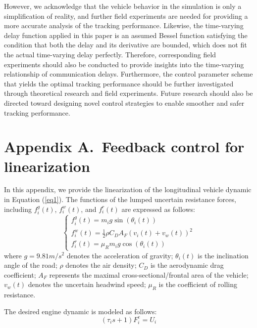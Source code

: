 \documentclass[a4paper]{cas-sc}
\begin{document}
However, we acknowledge that the vehicle behavior in the simulation is only a simplification of reality, and further field experiments are needed for providing a more accurate analysis of the tracking performance. Likewise, the time-varying delay function applied in this paper is an assumed Bessel function satisfying the condition that both the delay and its derivative are bounded, which does not fit the actual time-varying delay perfectly. Therefore, corresponding field experiments should also be conducted to provide insights into the time-varying relationship of communication delays. Furthermore, the control parameter scheme that yields the optimal tracking performance should be further investigated through theoretical research and field experiments. Future research should also be directed toward designing novel control strategies to enable smoother and safer tracking performance.


\appendix


\section*{Appendix A.~Feedback control for linearization}
\label{AppendixA}
In this appendix, we provide the linearization of the longitudinal vehicle dynamic in Equation (\ref{eq1}). The functions of the lumped uncertain resistance forces, including $f_i^g(t)$, $f_i^w(t)$, and $f_i^r(t)$ are expressed as follows:
\begin{equation}
  \left\{\begin{array}{l}
    f_{i}^{g}(t)=m_{i} g \sin \left(\theta_{i}(t)\right)                        \\
    f_{i}^{w}(t)=\frac{1}{2} \rho C_{D} A_{F}\left(v_{i}(t)+v_{w}(t)\right)^{2} \\
    f_{i}^{r}(t)=\mu_{R} m_{i} g \cos \left(\theta_{i}(t)\right)
  \end{array}\right.
  \label{eqapp5}
\end{equation}
where $g=9.81m/s^2$ denotes the acceleration of gravity; $\theta_i(t)$ is the inclination angle of the road; $\rho$ denotes the air density; $C_D$ is the aerodynamic drag coefficient; $A_F$ represents the maximal cross-sectional/frontal area of the vehicle; $v_w(t)$ denotes the uncertain headwind speed; $\mu_R$ is the coefficient of rolling resistance.

The desired engine dynamic is modeled as follows:
\begin{equation}
  (\tau_is+1)F_i^e=U_i
  \label{eqapp6}
\end{equation}
\end{document}
